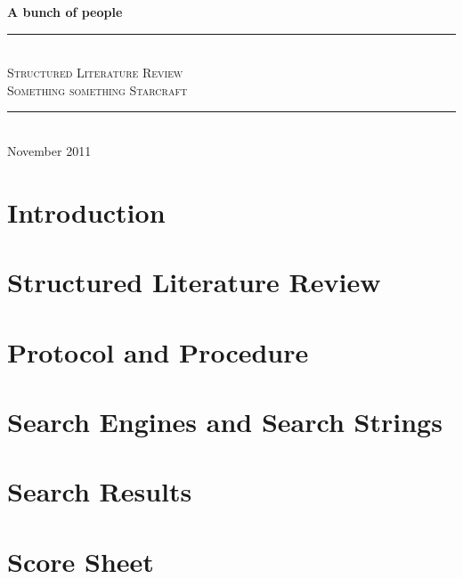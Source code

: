 \documentclass[11pt,a4paper,openany]{article}
\newcommand{\slrTitle}{Structured Literature Review}
\newcommand{\slrSubtitle}{Something something Starcraft}
\newcommand{\slrMadeby}{A bunch of people}
\newcommand{\slrDate}{November 2011}
\newcommand{\Hline}{\rule{\linewidth}{0.3mm} \\}
\begin{document}
\begin{titlepage}
\center
\large \textbf{\slrMadeby}

\vspace{3cm}
\Hline
\Huge \textsc{\slrTitle}
\vspace{2cm}
\huge \\ \textsc{\slrSubtitle}
\Hline
\vfill
\normalsize \slrDate

\end{titlepage}

\section{Introduction}


\section{Structured Literature Review}


\section{Protocol and Procedure}


\section{Search Engines and Search Strings}


\section{Search Results}


\section{Score Sheet}


\label{biblio}
 
\end{document}

